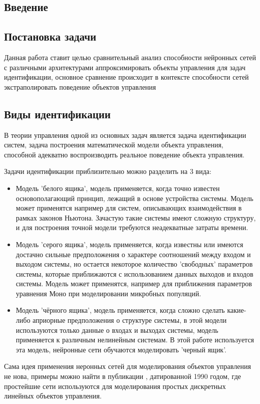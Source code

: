 \documentclass[12pt, oneside]{extbook}
\begin{document}
\begin{flushleft} \setlength{\parindent}{1cm}
\chapter{Введение}
\section{Постановка задачи}
Данная работа ставит целью сравнительный анализ способности нейронных сетей с различными архитектурами аппроксимировать объекты управления для задач идентификации, основное сравнение происходит в контексте способности сетей экстраполировать поведение объектов управления
\section{Виды идентификации}
В теории управления одной из основных задач является задача идентификации систем, задача построения математической модели объекта управления, способной адекватно воспроизводить реальное поведение объекта управления.
\par
Задачи идентификации приблизительно можно разделить на 3 вида:\\
\begin{itemize}
\item Модель 'белого ящика', модель применяется, когда точно известен основополагающий принцип, лежащий в основе устройства системы. Модель может применятся например для систем, описывающих взаимодействия в рамках законов Ньютона. Зачастую такие системы имеют сложную структуру, и для построения точной модели требуются неадекватные затраты времени.
\item Модель 'серого ящика', модель применяется, когда известны или имеются достачно сильные предположения о характере соотношений между входом и выходом системы, но остается некоторое количество 'свободных' параметров системы, которые приближаются с использованием данных выходов и входов системы. Модель может применятся, например для приближения параметров уравнения Моно при моделировании микробных популяций.
\item Модель 'чёрного ящика', модель применяется, когда сложно сделать какие-либо априорные предположения о структуре системы, в этой модели используются только данные о входах и выходах системы, модель применяется к различным нелинейным системам. В этой работе используется эта модель, нейронные сети обучаются моделировать 'черный ящик'. 
\end{itemize}
\par
Сама идея применения неронных сетей для моделирования объектов управления не нова, примеры можно найти в публикации \cite{fc90}, датированной 1990 годом, где простейшие сети используются для моделирования простых дискретных линейных объектов управления.

\end{flushleft}
\end{document}
